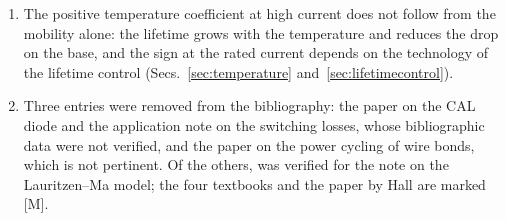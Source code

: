 \documentclass[10pt,a4paper]{scrartcl}
\begin{document}
\begin{enumerate}
\item The positive temperature coefficient at high current does not follow from the mobility alone: the lifetime grows with the temperature and reduces the drop on the base, and the sign at the rated current depends on the technology of the lifetime control (Secs.~\ref{sec:temperature} and~\ref{sec:lifetimecontrol}).
\item Three entries were removed from the bibliography: the paper on the CAL diode and the application note on the switching losses, whose bibliographic data were not verified, and the paper on the power cycling of wire bonds, which is not pertinent. Of the others, \cite{lauritzen1991} was verified for the note on the Lauritzen--Ma model; the four textbooks and the paper by Hall are marked [M].
\end{enumerate}
\end{document}
